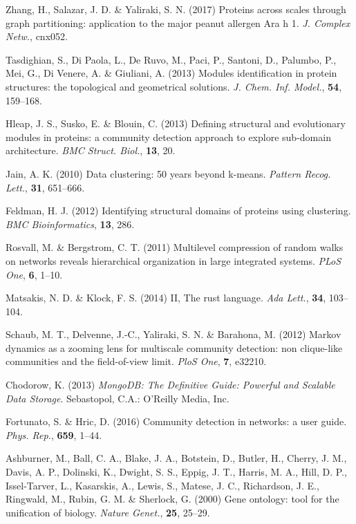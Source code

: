 \documentclass[a4paper,numbib, final, twoside, titelpage]{imaiai}%
\begin{document}
\begin{references}
{\sc Zhang, H., Salazar, J. D. \& Yaliraki, S. N.} (2017)  Proteins across scales through graph
partitioning: application to the major peanut allergen {Ara} h 1. \textit{J. Complex Netw.}, cnx052.

{\sc Tasdighian, S., Di Paola, L., De Ruvo, M., Paci, P., Santoni, D., Palumbo, P.,
  Mei, G., Di Venere, A. \& Giuliani, A.} (2013) Modules identification in protein
  structures: the topological and geometrical solutions. \textit{J. Chem.
  Inf. Model.}, {\bf 54}, 159--168.

{\sc Hleap, J. S., Susko, E. \& Blouin, C.} (2013) Defining structural and evolutionary modules
  in proteins: a community detection approach to explore sub-domain
  architecture. \textit{BMC Struct. Biol.}, {\bf 13}, 20.

{\sc Jain, A. K.} (2010) Data clustering: 50 years beyond k-means. \textit{Pattern Recog. Lett.},
  {\bf 31}, 651--666.

{\sc Feldman, H. J.} (2012) Identifying structural domains of proteins using clustering. \textit{BMC
  Bioinformatics}, {\bf 13}, 286.

{\sc Rosvall, M. \& Bergstrom, C. T.} (2011) Multilevel compression of random walks on networks
  reveals hierarchical organization in large integrated systems. \textit{PLoS One}, {\bf 6},
 1--10.

{\sc Matsakis, N. D. \& Klock, F. S.} (2014) II, The rust language. \textit{Ada Lett.}, {\bf 34}, 103--104.

{\sc Schaub, M. T., Delvenne, J.-C., Yaliraki, S. N. \& Barahona, M.} (2012) Markov dynamics as a
  zooming lens for multiscale community detection: non clique-like communities
  and the field-of-view limit. \textit{PloS One}, {\bf 7}, e32210.

{\sc  Chodorow, K.} (2013) \textit{{MongoDB}: The Definitive Guide: Powerful and Scalable Data
  Storage}. Sebastopol, C.A.: O'Reilly Media, Inc.

{\sc Fortunato, S. \& Hric, D.} (2016) Community detection in networks: a user guide. \textit{Phys. Rep.}, {\bf 659}, 1--44.

{\sc Ashburner, M., Ball, C. A., Blake, J. A., Botstein, D., Butler, H., Cherry, J. M.,
  Davis, A. P., Dolinski, K., Dwight, S. S., Eppig, J. T., Harris, M. A., Hill, D. P., Issel-Tarver, L., Kasarskis, A., Lewis, S., Matese, J. C., Richardson, J. E., Ringwald, M., Rubin, G. M. \& Sherlock, G.} (2000) Gene ontology:
  tool for the unification of biology. \textit{Nature Genet.}, {\bf 25}, 25--29.


\end{references}
\end{document}
